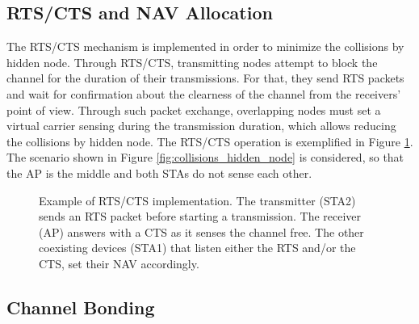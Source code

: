 \documentclass[a4paper]{article}
\begin{document}
	\subsection{RTS/CTS and NAV Allocation}
	The RTS/CTS mechanism is implemented in order to minimize the collisions by hidden node. Through RTS/CTS, transmitting nodes attempt to block the channel for the duration of their transmissions. For that, they send RTS packets and wait for confirmation about the clearness of the channel from the receivers' point of view. Through such packet exchange, overlapping nodes must set a virtual carrier sensing during the transmission duration, which allows reducing the collisions by hidden node. The RTS/CTS operation is exemplified in Figure \ref{fig:rts_cts_mechanism}. The scenario shown in Figure \ref{fig:collisions_hidden_node} is considered, so that the AP is the middle and both STAs do not sense each other.
	\begin{figure}[h!]
		\centering
		\caption{Example of RTS/CTS implementation. The transmitter (STA2) sends an RTS packet before starting a transmission. The receiver (AP) answers with a CTS as it senses the channel free. The other coexisting devices (STA1) that listen either the RTS and/or the CTS, set their NAV accordingly.}
		\label{fig:rts_cts_mechanism}
	\end{figure}	
		
	\subsection{Channel Bonding}
	\label{section:channel_bonding}
\end{document}
